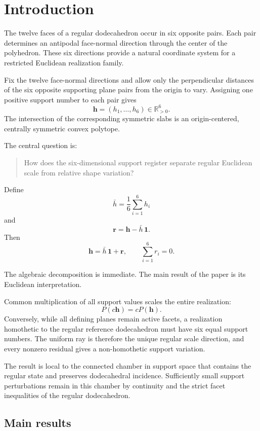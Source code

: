 \section{Introduction}

The twelve faces of a regular dodecahedron occur in six opposite pairs.
Each pair determines an antipodal face-normal direction through the center
of the polyhedron. These six directions provide a natural coordinate system
for a restricted Euclidean realization family.

Fix the twelve face-normal directions and allow only the perpendicular
distances of the six opposite supporting plane pairs from the origin to
vary. Assigning one positive support number to each pair gives
\[
\mathbf h=(h_1,\ldots,h_6)\in\mathbb R_{>0}^6.
\]
The intersection of the corresponding symmetric slabs is an
origin-centered, centrally symmetric convex polytope.

The central question is:

\begin{quote}
How does the six-dimensional support register separate regular Euclidean
scale from relative shape variation?
\end{quote}

Define
\[
\bar h
=
\frac{1}{6}\sum_{i=1}^{6}h_i
\]
and
\[
\mathbf r
=
\mathbf h-\bar h\,\mathbf 1.
\]
Then
\[
\mathbf h
=
\bar h\,\mathbf 1+\mathbf r,
\qquad
\sum_{i=1}^{6}r_i=0.
\]

The algebraic decomposition is immediate. The main result of the paper is
its Euclidean interpretation.

Common multiplication of all support values scales the entire realization:
\[
P(c\mathbf h)=cP(\mathbf h).
\]
Conversely, while all defining planes remain active facets, a realization
homothetic to the regular reference dodecahedron must have six equal support
numbers. The uniform ray is therefore the unique regular scale direction,
and every nonzero residual gives a non-homothetic support variation.

The result is local to the connected chamber in support space that contains
the regular state and preserves dodecahedral incidence. Sufficiently small
support perturbations remain in this chamber by continuity and the strict
facet inequalities of the regular dodecahedron.

\subsection{Main results}

